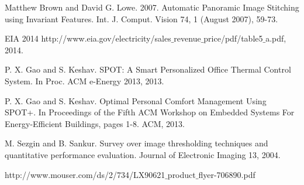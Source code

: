   Matthew Brown and David G. Lowe. 2007. Automatic Panoramic Image Stitching using Invariant Features. Int. J. Comput. Vision 74, 1 (August 2007), 59-73.

 EIA 2014  http://www.eia.gov/electricity/sales$\_$revenue$\_$price/pdf/table5$\_$a.pdf, 2014.

 P. X. Gao and S. Keshav. SPOT: A Smart Personalized Office Thermal Control System. In Proc. ACM e-Energy 2013, 2013.

 P. X. Gao and S. Keshav. Optimal Personal Comfort Management Using SPOT+. In Proceedings of the Fifth ACM Workshop on Embedded Systems For Energy-Efficient Buildings, pages 1-8. ACM, 2013.

 M. Sezgin and B. Sankur. Survey over image thresholding techniques and quantitative performance evaluation. Journal of Electronic Imaging 13, 2004.

 http://www.mouser.com/ds/2/734/LX90621$\_$product$\_$flyer-706890.pdf